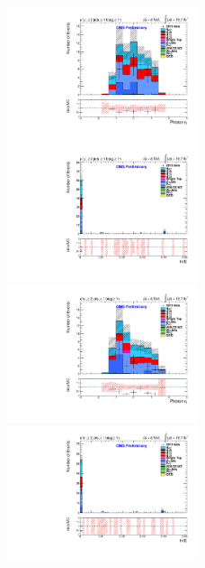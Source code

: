 \documentclass[oneside, a4paper, 11pt, ]{report}
\begin{document}
\begin{figure}
\includegraphics[width=0.5\textwidth]{Plots/ControlPlots/TTbarPhotonAnalysis/MuMu/Photons/SignalPhotons/Photon_Eta_splitTTbar_ratio.pdf}
\includegraphics[width=0.5\textwidth]{Plots/ControlPlots/TTbarPhotonAnalysis/MuMu/Photons/SignalPhotons/Photon_HtowoE_splitTTbar_ratio.pdf} \\
\includegraphics[width=0.5\textwidth]{Plots/ControlPlots/TTbarPhotonAnalysis/EE/Photons/SignalPhotons/Photon_Eta_splitTTbar_ratio.pdf}
\includegraphics[width=0.5\textwidth]{Plots/ControlPlots/TTbarPhotonAnalysis/EE/Photons/SignalPhotons/Photon_HtowoE_splitTTbar_ratio.pdf}\\

\end{figure}
\end{document}
